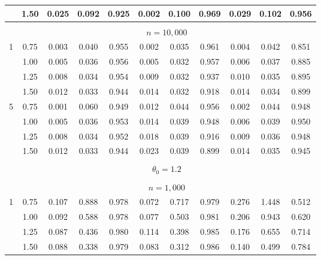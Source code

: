 \documentclass[lettersize, 12pt]{article}
\begin{document}
{\begin{table}
\begin{center}
\begin{tabular*}{0.9\textwidth}{@{}cc|ccc|ccc|ccc@{}}
                 & 1.50  & 0.025 & 0.092 & 0.925 & 0.002 & 0.100 & 0.969 &	0.029	&	0.102	&	0.956\\
          \hline\\[-14pt]
& \multicolumn{10}{c}{$n=10,000$} \\[2pt]     %
           1       & 0.75  & 0.003 & 0.040 & 0.955 & 0.002 & 0.035 & 0.961&	0.004	&	0.042	&	0.851 \\
                 & 1.00  & 0.005 & 0.036 & 0.956 & 0.005 & 0.032 & 0.957 &	0.006	&	0.037	&	0.885\\
                 & 1.25  & 0.008 & 0.034 & 0.954 & 0.009 & 0.032 & 0.937 &	0.010	&	0.035	&	0.895\\
                 & 1.50  & 0.012 & 0.033 & 0.944 & 0.014 & 0.032 & 0.918 &	0.014	&	0.034	&	0.899\\
\hline
          5       & 0.75  & 0.001 & 0.060 & 0.949 & 0.012 & 0.044 & 0.956 &	0.002	&	0.044	&	0.948\\
                 & 1.00  & 0.005 & 0.036 & 0.953 & 0.014 & 0.039 & 0.948 &	0.006	&	0.039	&	0.950\\
                & 1.25  & 0.008 & 0.034 & 0.952 & 0.018 & 0.039 & 0.916 &	0.009	&	0.036	&	0.948\\
                 & 1.50  & 0.012 & 0.033 & 0.944 & 0.023 & 0.039 & 0.899 &	0.014	&	0.035	&	0.945\\
\hline
\hline
\\[-12pt]
& \multicolumn{10}{c}{$\theta_0 = 1.2$} \\[2pt]
\hline\\[-14pt]
  &  \multicolumn{10}{c}{$n=1,000$} \\[2pt]    %
          1     & 0.75  & 0.107 & 0.888 & 0.978 & 0.072 & 0.717 & 0.979 &	0.276	&	1.448	&	0.512\\
                 & 1.00  & 0.092 & 0.588 & 0.978 & 0.077 & 0.503 & 0.981&	0.206	&	0.943	&	0.620 \\
                 & 1.25  & 0.087 & 0.436 & 0.980 & 0.114 & 0.398 & 0.985 &	0.176	&	0.655	&	0.714\\
                 & 1.50  & 0.088 & 0.338 & 0.979 & 0.083 & 0.312 & 0.986 &	0.140	&	0.499	&	0.784\\
\hline

\end{tabular*}
\end{center}
\end{table}}
\end{document}
